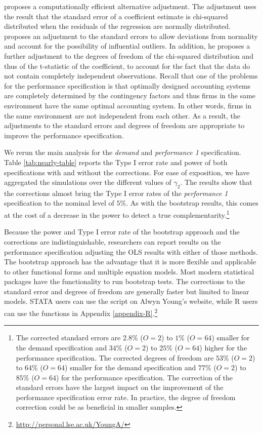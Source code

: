 \documentclass[12pt]{article}
\begin{document}
\citet{young_improved_2016} proposes a computationally efficient alternative adjustment. The adjustment uses the result that the standard error of a coefficient estimate is chi-squared distributed when the residuals of the regression are normally distributed. \cite{young_improved_2016} proposes an adjustment to the standard errors to allow deviations from normality and account for the possibility of influential outliers. In addition, he proposes a further adjustment to the degrees of freedom of the chi-squared distribution and thus of the t-statistic of the coefficient, to account for the fact that the data do not contain completely independent observations. Recall that one of the problems for the performance specification is that optimally designed accounting systems are completely determined by the contingency factors and thus firms in the same environment have the same optimal accounting system. In other words, firms in the same environment are not independent from each other. As a result, the adjustments to the standard errors and degrees of freedom are appropriate to improve the performance specification.

We rerun the main analysis for the \emph{demand} and \emph{performance 1} specification. Table \ref{tab:nearly-table} reports the Type I error rate and power of both specifications with and without the corrections. For ease of exposition, we have aggregated the simulations over the different values of $\gamma_2$. The results show that the corrections almost bring the Type I error rates of the \emph{performance 1} specification to the nominal level of $5\%$. As with the bootstrap results, this comes at the cost of a decrease in the power to detect a true complementarity.\footnote{The corrected standard errors are $2.8\%$ ($O = 2$) to $1\%$ ($O = 64$) smaller for the demand specification and $34\%$ ($O = 2$) to $25\%$ ($O = 64$) higher for the performance specification. The corrected degrees of freedom are $53\%$ ($O = 2$) to $64\%$ ($O = 64$) smaller for the demand specification and $77\%$ ($O = 2$) to $85\%$ ($O = 64$) for the performance specification. The correction of the standard errors have the largest impact on the improvement of the performance specification error rate. In practice, the degree of freedom correction could be as beneficial in smaller samples.}



Because the power and Type I error rate of the bootstrap approach and the \citet{young_improved_2016} corrections are indistinguishable, researchers can report results on the performance specification adjusting the OLS results with either of those methods. The bootstrap approach has the advantage that it is more flexible and applicable to other functional forms and multiple equation models. Most modern statistical packages have the functionality to run bootstrap tests. The corrections to the standard error and degrees of freedom are generally faster but limited to linear models. STATA users can use the script on Alwyn Young's website, while R users can use the functions in Appendix \ref{appendix-R}.\footnote{\url{http://personal.lse.ac.uk/YoungA/}}
\end{document}
